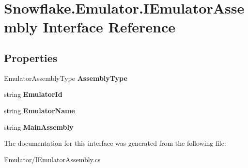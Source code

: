 \hypertarget{interface_snowflake_1_1_emulator_1_1_i_emulator_assembly}{}\section{Snowflake.\+Emulator.\+I\+Emulator\+Assembly Interface Reference}
\label{interface_snowflake_1_1_emulator_1_1_i_emulator_assembly}
\subsection*{Properties}
\begin{DoxyCompactItemize}
\item 
\hypertarget{interface_snowflake_1_1_emulator_1_1_i_emulator_assembly_a379ad80beb0533edf5f5dec1fd367bf5}{}Emulator\+Assembly\+Type {\bfseries Assembly\+Type}\label{interface_snowflake_1_1_emulator_1_1_i_emulator_assembly_a379ad80beb0533edf5f5dec1fd367bf5}

\item 
\hypertarget{interface_snowflake_1_1_emulator_1_1_i_emulator_assembly_ac162ebc65db2e683abe026d40ae84add}{}string {\bfseries Emulator\+Id}\label{interface_snowflake_1_1_emulator_1_1_i_emulator_assembly_ac162ebc65db2e683abe026d40ae84add}

\item 
\hypertarget{interface_snowflake_1_1_emulator_1_1_i_emulator_assembly_a2e831ecb3fb8ba836d5cd956e6c3345d}{}string {\bfseries Emulator\+Name}\label{interface_snowflake_1_1_emulator_1_1_i_emulator_assembly_a2e831ecb3fb8ba836d5cd956e6c3345d}

\item 
\hypertarget{interface_snowflake_1_1_emulator_1_1_i_emulator_assembly_a78de4bc3fd1de42df6488ca4bc0dcc82}{}string {\bfseries Main\+Assembly}\label{interface_snowflake_1_1_emulator_1_1_i_emulator_assembly_a78de4bc3fd1de42df6488ca4bc0dcc82}

\end{DoxyCompactItemize}


The documentation for this interface was generated from the following file\+:\begin{DoxyCompactItemize}
\item 
Emulator/I\+Emulator\+Assembly.\+cs\end{DoxyCompactItemize}
